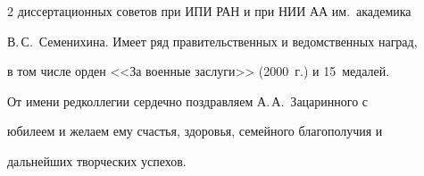 \begin{multicols}{2}
диссертационных советов при ИПИ РАН и при НИИ АА им.\ академика 

В.\,С.~Семенихина. Имеет ряд правительственных и ведомственных наград, 

в том числе орден <<За военные заслуги>> (2000~г.) и 15~медалей. 



\label{end\stat}



     \bigskip

     От имени редколлегии сердечно поздравляем А.\,А.~Зацаринного с 

юбилеем и желаем ему счастья, здоровья, семейного благополучия и 

дальнейших творческих успехов. 

\end{multicols}  




